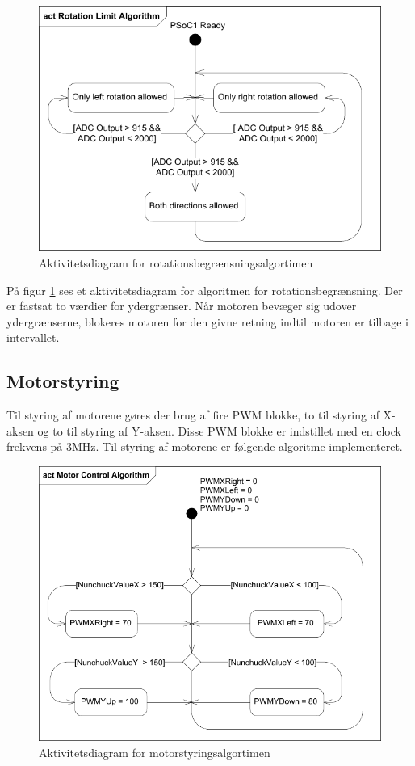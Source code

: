 \begin{figure}[H]
	\centering
	\includegraphics[width=\textwidth]{DesignOgImplementering/images/rotationalgorithm}
	\caption{Aktivitetsdiagram for rotationsbegrænsningsalgortimen}
	\label{fig:rotation}
	
\end{figure}

\noindent På figur \ref{fig:rotation} ses et aktivitetsdiagram for algoritmen for rotationsbegrænsning. Der er fastsat to værdier for ydergrænser. Når motoren bevæger sig udover ydergrænserne, blokeres motoren for den givne retning indtil motoren er tilbage i intervallet. 

\subsection{Motorstyring}
Til styring af motorene gøres der brug af fire PWM blokke, to til styring af X-aksen og to til styring af Y-aksen. Disse PWM blokke er indstillet med en clock frekvens på 3MHz. Til styring af motorene er følgende algoritme implementeret. 
\begin{figure}[H]
	\centering
	\includegraphics[scale=0.8]{DesignOgImplementering/images/motorcontrolalgorithm}
	\caption{Aktivitetsdiagram for motorstyringsalgortimen}
	\label{fig:motorstyringal}
\end{figure}

